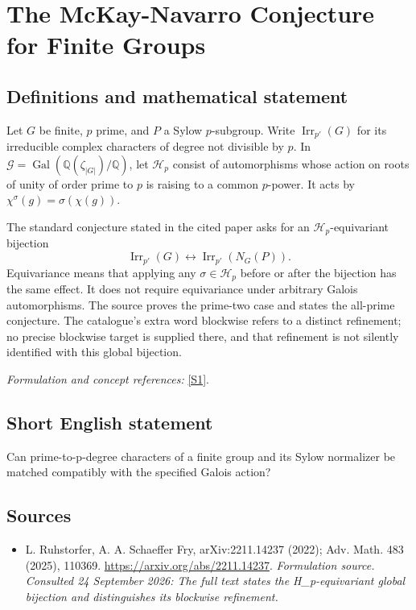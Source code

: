 \documentclass[11pt]{article}
\begin{document}
\section*{\texorpdfstring{The McKay-Navarro Conjecture for Finite Groups}{The McKay-Navarro Conjecture for Finite Groups}}\label{495}
\subsection{Definitions and mathematical statement}
Let $G$ be finite, $p$ prime, and $P$ a Sylow $p$-subgroup. Write $\operatorname{Irr}_{p'}(G)$ for its irreducible complex characters of degree not divisible by $p$. In $\mathcal G=\operatorname{Gal}({\mathbb{Q}}(\zeta_{|G|})/{\mathbb{Q}})$, let $\mathcal H_p$ consist of automorphisms whose action on roots of unity of order prime to $p$ is raising to a common $p$-power. It acts by $\chi^\sigma(g)=\sigma(\chi(g))$.

The standard conjecture stated in the cited paper asks for an $\mathcal H_p$-equivariant bijection
\[
 \operatorname{Irr}_{p'}(G)\longleftrightarrow
 \operatorname{Irr}_{p'}(N_G(P)).
\]
Equivariance means that applying any $\sigma\in\mathcal H_p$ before or after the bijection has the same effect. It does not require equivariance under arbitrary Galois automorphisms. The source proves the prime-two case and states the all-prime conjecture. The catalogue's extra word blockwise refers to a distinct refinement; no precise blockwise target is supplied there, and that refinement is not silently identified with this global bijection.
\par\smallskip\textit{Formulation and concept references:} \href{https://arxiv.org/abs/2211.14237}{[S1]}.

\subsection{Short English statement}
Can prime-to-p-degree characters of a finite group and its Sylow normalizer be matched compatibly with the specified Galois action?
\subsection{Sources}
\begin{itemize}
\item[S1]L. Ruhstorfer, A. A. Schaeffer Fry, arXiv:2211.14237 (2022); Adv. Math. 483 (2025), 110369.
\url{https://arxiv.org/abs/2211.14237}.
\textit{Formulation source. Consulted 24 September 2026: The full text states the H\_p-equivariant global bijection and distinguishes its blockwise refinement.}
\end{itemize}
\end{document}
